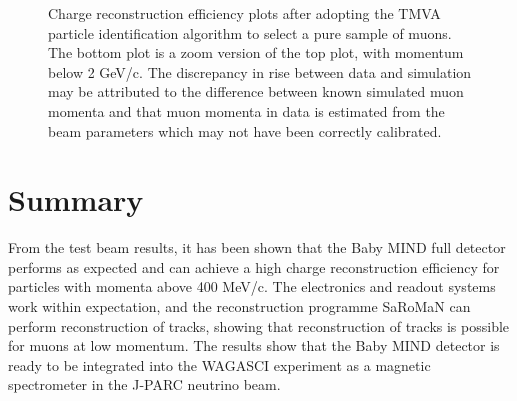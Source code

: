 \begin{figure}[h!]

\caption{Charge reconstruction efficiency plots after adopting the TMVA particle identification algorithm to select a pure sample of muons. The bottom plot is a zoom version of the top plot, with momentum below 2 GeV/c. The discrepancy in rise between data and simulation may be attributed to the difference between known simulated muon momenta and that muon momenta in data is estimated from the beam parameters which may not have been correctly calibrated.}
\label{fig:ChargeImproved}
\end{figure}





\section{Summary}
From the test beam results, it has been shown that the Baby MIND full detector performs as expected and can achieve a high charge reconstruction efficiency for particles with momenta above 400 MeV/c. The electronics and readout systems work within expectation, and the reconstruction programme SaRoMaN can perform reconstruction of tracks, showing that reconstruction of tracks is possible for muons at low momentum. The results show that the Baby MIND detector is ready to be integrated into the WAGASCI experiment as a magnetic spectrometer in the J-PARC neutrino beam.



